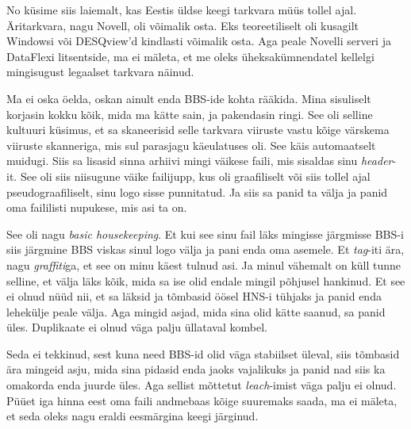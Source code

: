 
No küsime siis laiemalt, kas Eestis üldse keegi tarkvara müüs tollel ajal. 
Äritarkvara, nagu Novell, oli võimalik osta. Eks teoreetiliselt oli kusagilt 
Windowsi või DESQview'd  kindlasti võimalik osta. Aga peale Novelli serveri ja DataFlexi 
litsentside, ma ei mäleta, et me oleks üheksakümnendatel kellelgi mingisugust 
legaalset tarkvara näinud. 


Ma ei oska öelda, oskan ainult enda BBS-ide kohta rääkida. Mina 
sisuliselt korjasin kokku kõik, mida ma kätte sain, ja pakendasin ringi. See 
oli selline kultuuri küsimus, et sa skaneerisid selle tarkvara viiruste vastu 
kõige värskema viiruste skanneriga, mis sul parasjagu käeulatuses oli. See käis 
automaatselt muidugi. Siis sa lisasid sinna arhiivi mingi väikese faili, 
mis sisaldas sinu \emph{header}-it. See oli siis niisugune väike 
failijupp, kus oli graafiliselt või siis tollel ajal pseudograafiliselt, sinu 
logo sisse punnitatud. Ja siis sa panid ta välja ja panid oma faililisti nupukese, mis asi ta on. 

See oli nagu \emph{basic housekeeping}. Et kui see sinu fail läks mingisse 
järgmisse BBS-i siis järgmine BBS viskas sinul logo välja ja pani enda oma 
asemele. Et \emph{tag}-iti ära, nagu \emph{graffiti}ga, et see on 
minu käest tulnud asi. Ja minul vähemalt on küll tunne selline, et välja läks 
kõik, mida sa ise olid endale mingil põhjusel hankinud. Et see ei olnud nüüd 
nii, et sa läksid ja tõmbasid öösel HNS-i tühjaks ja 
panid enda lehekülje peale välja. Aga mingid asjad, mida sina olid kätte 
saanud, sa panid üles. Duplikaate ei olnud väga palju üllataval kombel.


Seda ei tekkinud, sest kuna need BBS-id olid väga stabiilset üleval, siis 
tõmbasid ära mingeid asju, mida sina pidasid enda jaoks vajalikuks ja panid nad 
siis ka omakorda enda juurde üles. Aga sellist mõttetut \emph{leach}-imist  väga 
palju ei olnud. Püüet iga hinna eest oma faili andmebaas kõige suuremaks saada, 
ma ei mäleta, et seda oleks nagu eraldi eesmärgina keegi järginud. 

